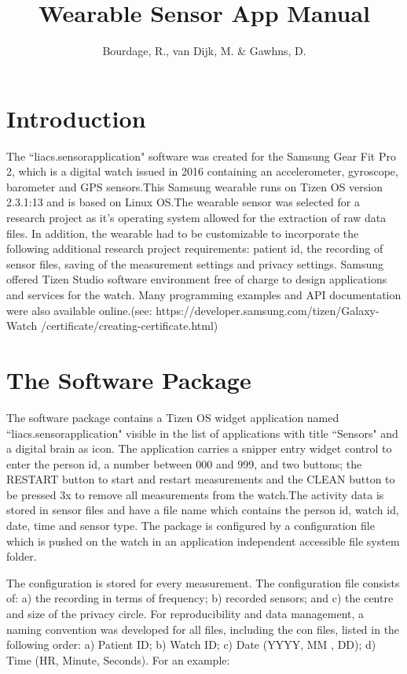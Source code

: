 \documentclass[12pt, a4paper]{article}
\title{Wearable Sensor App Manual}
\author{Bourdage, R., van Dijk, M. \& Gawhns, D.}
\date{Leiden Institute of Advance Computer Science

 June 2021}
\begin{document}
\maketitle
\thispagestyle{empty} 
\newpage
\tableofcontents
\newpage
\cleardoublepage


\section{Introduction}

The ``liacs.sensorapplication" software was created for the Samsung Gear Fit Pro 2, which is a digital watch issued in 2016 containing an  accelerometer, gyroscope, barometer and GPS sensors.This Samsung wearable runs on Tizen OS version 2.3.1:13 and is based on Linux OS.The wearable sensor was selected for a research project as it's operating system allowed for the extraction of raw data files. In addition, the wearable had to be customizable to incorporate the following additional research project requirements: patient id, the recording of sensor files, saving of the measurement settings and privacy settings. Samsung offered Tizen Studio software environment free of charge to design applications and services for the watch. Many programming examples and API documentation were also available online.(see: https://developer.samsung.com/tizen/Galaxy-Watch /certificate/creating-certificate.html)

\cleardoublepage

\section{The Software Package}
The software package contains a Tizen OS widget application named  ``liacs.sensorapplication" visible in the list of applications with title ``Sensors" and a digital brain as icon. The application carries a snipper entry widget control to enter the person id, a number between 000 and 999, and two buttons; the RESTART button to start and restart measurements and the CLEAN button to be pressed 3x to remove all measurements from the watch.The activity data is stored in sensor files and have a file name which contains the person id, watch id, date, time and sensor type. The package is configured by a configuration file which is pushed on the watch in an application independent accessible file system folder. 



The configuration is stored for every measurement. The configuration file consists of: a) the recording in terms of frequency; b) recorded sensors; and c) the centre and size of the privacy circle. For reproducibility and data management, a naming convention was developed for all files, including the con files, listed in the following order: a) Patient ID; b) Watch ID; c) Date (YYYY, MM , DD); d) Time (HR, Minute, Seconds). For an example:
\end{document}

